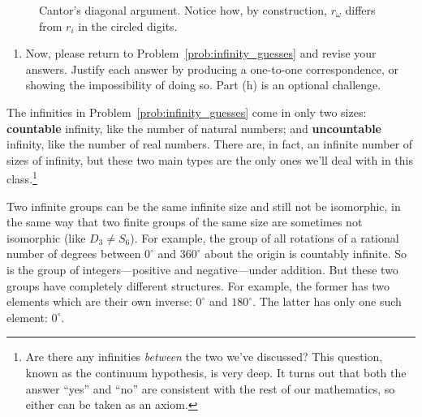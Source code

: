 \documentclass[../textbook.tex]{subfiles}
\begin{document}
\begin{figure}[h]
\begin{center}
\begin{minipage}[b]{\textwidth}
			\vspace*{0.5\baselineskip}
		\end{minipage}
	\end{center}
	\vspace*{-2\baselineskip}
	\begin{center}
		\begin{minipage}[t]{\textwidth}
			\caption{Cantor's diagonal argument. Notice how, by construction, $r_\omega$ differs from $r_i$ in the circled digits.}
			\label{fig:cantor_diag}
		\end{minipage}
	\end{center}
	\vspace*{-2\baselineskip}
\end{figure}

\begin{enumerate}
\setcounter{enumi}{\value{problem_i}}
\item Now, please return to Problem~\ref{prob:infinity_guesses} and revise your answers. Justify each answer by producing a one-to-one correspondence, or showing the impossibility of doing so. Part (h) is an optional challenge.
\setcounter{problem_i}{\value{enumi}}
\end{enumerate}

\noindent The infinities in Problem~\ref{prob:infinity_guesses} come in only two sizes: \textbf{countable} infinity, like the number of natural numbers; and \textbf{uncountable} infinity, like the number of real numbers. There are, in fact, an infinite number of sizes of infinity, but these two main types are the only ones we'll deal with in this class.\footnote{Are there any infinities \textit{between} the two we’ve discussed? This question, known as the continuum hypothesis, is very deep. It turns out that both the answer ``yes'' and ``no'' are consistent with the rest of our mathematics, so either can be taken as an axiom.}

Two infinite groups can be the same infinite size and still not be isomorphic, in the same way that two finite groups of the same size are sometimes not isomorphic (like $D_3\neq S_6$). For example, the group of all rotations of a rational number of degrees between $0^\circ$ and $360^\circ$ about the origin is countably infinite. So is the group of integers---positive and negative---under addition. But these two groups have completely different structures. For example, the former has two
elements which are their own inverse: $0^\circ$ and $180^\circ$. The latter has only one such element: $0^\circ$.
\end{document}
